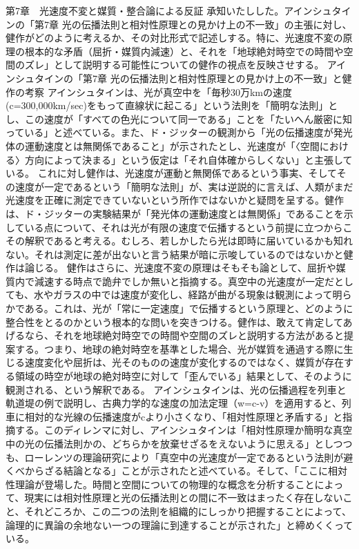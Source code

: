 \documentclass{article}
\begin{document}
第7章　光速度不変と媒質・整合論による反証
承知いたしした。アインシュタインの「第7章 光の伝播法則と相対性原理との見かけ上の不一致」の主張に対し、健作がどのように考えるか、その対比形式で記述しする。特に、光速度不変の原理の根本的な矛盾（屈折・媒質内減速）と、それを「地球絶対時空での時間や空間のズレ」として説明する可能性についての健作の視点を反映させする。
アインシュタインの「第7章 光の伝播法則と相対性原理との見かけ上の不一致」と健作の考察
アインシュタインは、光が真空中を「毎秒30万kmの速度(c=300,000km/sec)をもって直線状に起こる」という法則を「簡明な法則」とし、この速度が「すべての色光について同一である」ことを「たいへん厳密に知っている」と述べている。また、ド・ジッターの観測から「光の伝播速度が発光体の運動速度とは無関係であること」が示されたとし、光速度が「〈空間における〉方向によって決まる」という仮定は「それ自体確からしくない」と主張している。
これに対し健作は、光速度が運動と無関係であるという事実、そしてその速度が一定であるという「簡明な法則」が、実は逆説的に言えば、人類がまだ光速度を正確に測定できていないという所作ではないかと疑問を呈する。健作は、ド・ジッターの実験結果が「発光体の運動速度とは無関係」であることを示している点について、それは光が有限の速度で伝播するという前提に立つからこその解釈であると考える。むしろ、若しかしたら光は即時に届いているかも知れない。それは測定に差が出ないと言う結果が暗に示唆しているのではないかと健作は論じる。
健作はさらに、光速度不変の原理はそもそも論として、屈折や媒質内で減速する時点で詭弁でしか無いと指摘する。真空中の光速度が一定だとしても、水やガラスの中では速度が変化し、経路が曲がる現象は観測によって明らかである。これは、光が「常に一定速度」で伝播するという原理と、どのように整合性をとるのかという根本的な問いを突きつける。健作は、敢えて肯定してあげるなら、それを地球絶対時空での時間や空間のズレと説明する方法があると提案する。つまり、地球の絶対時空を基準とした場合、光が媒質を通過する際に生じる速度変化や屈折は、光そのものの速度が変化するのではなく、媒質が存在する領域の時空が地球の絶対時空に対して「歪んでいる」結果として、そのように観測される、という解釈である。
アインシュタインは、光の伝播過程を列車と軌道堤の例で説明し、古典力学的な速度の加法定理（w=c-v）を適用すると、列車に相対的な光線の伝播速度がcより小さくなり、「相対性原理と矛盾する」と指摘する。このディレンマに対し、アインシュタインは「相対性原理か簡明な真空中の光の伝播法則かの、どちらかを放棄せざるをえないように思える」としつつも、ローレンツの理論研究により「真空中の光速度が一定であるという法則が避くべからざる結論となる」ことが示されたと述べている。そして、「ここに相対性理論が登場した。時間と空間についての物理的な概念を分析することによって、現実には相対性原理と光の伝播法則との間に不一致はまったく存在しないこと、それどころか、この二つの法則を組織的にしっかり把握することによって、論理的に異論の余地ない一つの理論に到達することが示された」と締めくくっている。
\end{document}
